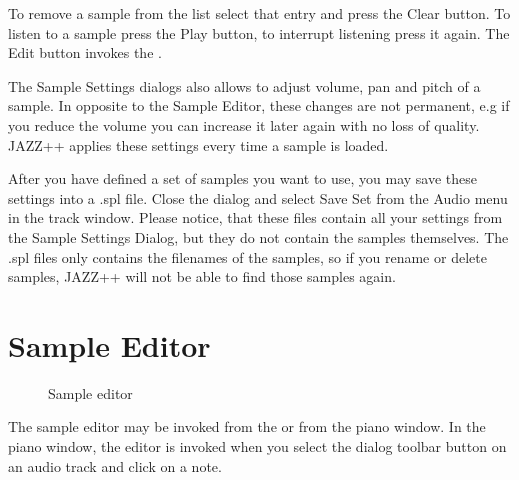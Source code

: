 \documentclass[letterpaper]{report}
\begin{document}
To remove a sample from the list select that entry and press the Clear
button. To listen to a sample press the Play button, to interrupt
listening press it again. The Edit button invokes the .

The Sample Settings dialogs also allows to adjust volume, pan and pitch
of a sample. In opposite to the Sample Editor, these changes are not
permanent, e.g if you reduce the volume you can increase it later again
with no loss of quality. JAZZ++ applies these settings every time a sample
is loaded.

After you have defined a set of samples you want to use, you may
save these settings into a .spl file. Close the dialog and select Save Set from the
Audio menu in the track window. Please notice, that these files contain all
your settings from the Sample Settings Dialog, but they do not contain
the samples themselves. The .spl files only contains the filenames of
the samples, so if you rename or delete samples, JAZZ++ will not be able
to find those samples again.

\section{Sample Editor}\label{samplewin}

\begin{figure}
\caption{Sample editor}
\end{figure}

The sample editor may be invoked from the
 or from the piano window.
In the piano window, the editor is invoked when you select the dialog
toolbar button on an audio track and click on a note.
\end{document}
